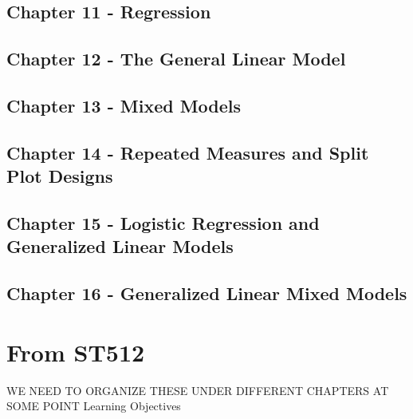 \documentclass[]{book}
\begin{document}
\hypertarget{chapter-11---regression}{%
\subsection{Chapter 11 - Regression}\label{chapter-11---regression}}

\hypertarget{chapter-12---the-general-linear-model}{%
\subsection{Chapter 12 - The General Linear Model}\label{chapter-12---the-general-linear-model}}

\hypertarget{chapter-13---mixed-models}{%
\subsection{Chapter 13 - Mixed Models}\label{chapter-13---mixed-models}}

\hypertarget{chapter-14---repeated-measures-and-split-plot-designs}{%
\subsection{Chapter 14 - Repeated Measures and Split Plot Designs}\label{chapter-14---repeated-measures-and-split-plot-designs}}

\hypertarget{chapter-15---logistic-regression-and-generalized-linear-models}{%
\subsection{Chapter 15 - Logistic Regression and Generalized Linear Models}\label{chapter-15---logistic-regression-and-generalized-linear-models}}

\hypertarget{chapter-16---generalized-linear-mixed-models}{%
\subsection{Chapter 16 - Generalized Linear Mixed Models}\label{chapter-16---generalized-linear-mixed-models}}

\hypertarget{from-st512}{%
\section{From ST512}\label{from-st512}}

WE NEED TO ORGANIZE THESE UNDER DIFFERENT CHAPTERS AT SOME POINT
Learning Objectives
\end{document}
